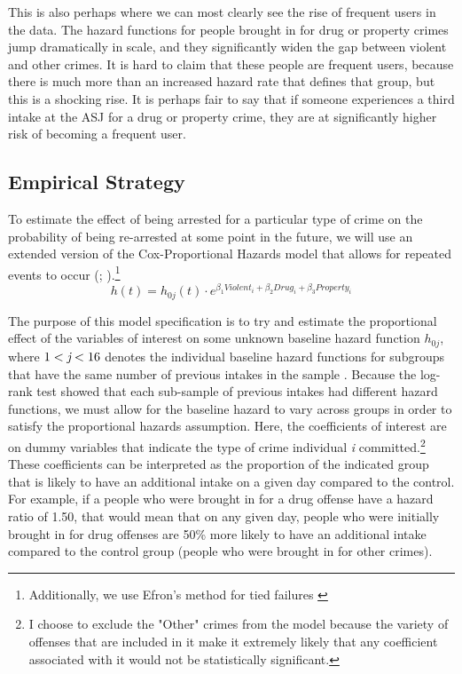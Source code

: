 \documentclass{article}
\begin{document}
This is also perhaps where we can most clearly see the rise of frequent users in the data. The hazard functions for people brought in for drug or property crimes jump dramatically in scale, and they significantly widen the gap between violent and other crimes. It is hard to claim that these people are frequent users, because there is much more than an increased hazard rate that defines that group, but this is a shocking rise. It is perhaps fair to say that if someone experiences a third intake at the ASJ for a drug or property crime, they are at significantly higher risk of becoming a frequent user. 

\subsection{Empirical Strategy}
\label{Emp}
To estimate the effect of being arrested for a particular type of crime on the probability of being re-arrested at some point in the future, we will use an extended version of the Cox-Proportional Hazards model that allows for repeated events to occur (\cite{cox}; \cite{andersen}).\footnote{Additionally, we use Efron's method for tied failures \parencite{efron}} 
\begin{equation}
\label{eq}
    h(t) = h_{0j}(t)\cdot e^{\beta_1 Violent_i + \beta_2 Drug_i + \beta_3 Property_i}
\end{equation}

The purpose of this model specification is to try and estimate the proportional effect of the variables of interest on some unknown baseline hazard function $h_{0j}$, where $1<\emph{j}<16$ denotes the individual baseline hazard functions for subgroups that have the same number of previous intakes in the sample \parencite{bradburn}. Because the log-rank test showed that each sub-sample of previous intakes had different hazard functions, we must allow for the baseline hazard to vary across groups in order to satisfy the proportional hazards assumption.  Here, the coefficients of interest are on dummy variables that indicate the type of crime individual \emph{i} committed.\footnote{I choose to exclude the "Other" crimes from the model because the variety of offenses that are included in it make it extremely likely that any coefficient associated with it would not be statistically significant.} These coefficients can be interpreted as the proportion of the indicated group that is likely to have an additional intake on a given day compared to the control. For example, if a people who were brought in for a drug offense have a hazard ratio of 1.50, that would mean that on any given day, people who were initially brought in for drug offenses are 50\% more likely to have an additional intake compared to the control group (people who were brought in for other crimes). 
\end{document}
